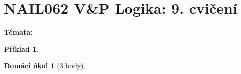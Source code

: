 \documentclass[a4paper]{article}
\theoremstyle{definition}
\newtheorem{problem}{Příklad}
\newtheorem*{ukol}{Domácí úkol}
\begin{document}
\section*{NAIL062 V\&P Logika: 9. cvičení}


\textbf{Témata:}



\medskip\begin{problem}
 
\end{problem}


\medskip\begin{ukol}[3 body]

\end{ukol}
\end{document}
